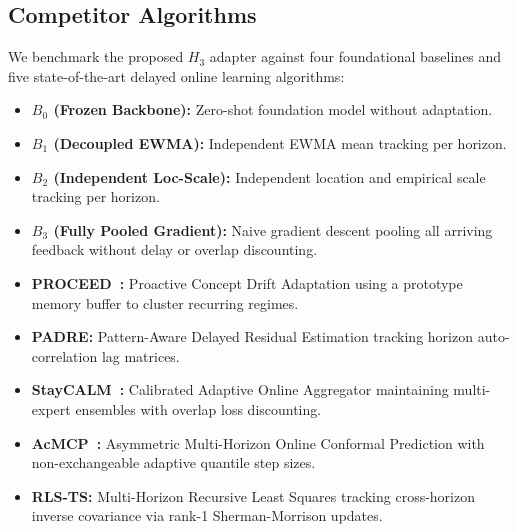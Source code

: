 \documentclass[10pt,journal,compsoc]{IEEEtran}
\begin{document}
\subsection{Competitor Algorithms}
We benchmark the proposed $H_3$ adapter against four foundational baselines and five state-of-the-art delayed online learning algorithms:
\begin{itemize}
    \item \textbf{$B_0$ (Frozen Backbone):} Zero-shot foundation model without adaptation.
    \item \textbf{$B_1$ (Decoupled EWMA):} Independent EWMA mean tracking per horizon.
    \item \textbf{$B_2$ (Independent Loc-Scale):} Independent location and empirical scale tracking per horizon.
    \item \textbf{$B_3$ (Fully Pooled Gradient):} Naive gradient descent pooling all arriving feedback without delay or overlap discounting.
    \item \textbf{PROCEED~\cite{lu2018learning}:} Proactive Concept Drift Adaptation using a prototype memory buffer to cluster recurring regimes.
    \item \textbf{PADRE:} Pattern-Aware Delayed Residual Estimation tracking horizon auto-correlation lag matrices.
    \item \textbf{StayCALM~\cite{gibbs2021adaptive}:} Calibrated Adaptive Online Aggregator maintaining multi-expert ensembles with overlap loss discounting.
    \item \textbf{AcMCP~\cite{barber2023conformal}:} Asymmetric Multi-Horizon Online Conformal Prediction with non-exchangeable adaptive quantile step sizes.
    \item \textbf{RLS-TS:} Multi-Horizon Recursive Least Squares tracking cross-horizon inverse covariance via rank-1 Sherman-Morrison updates.
\end{itemize}
\end{document}
